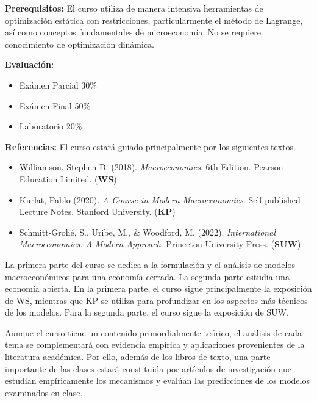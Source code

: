 \documentclass[12pt]{article}
\begin{document}
\noindent \textbf{Prerequisitos:} El curso utiliza de manera intensiva herramientas de optimización estática con restricciones, particularmente el método de Lagrange, así como conceptos fundamentales de microeconomía. No se requiere conocimiento de optimización dinámica.

\vspace{0.5cm}

\noindent \textbf{Evaluación:}
\begin{itemize}
    \item Exámen Parcial 30\%
    \item Exámen Final 50\%
    \item Laboratorio 20\%
\end{itemize}

\vspace{0.5cm}

\noindent \textbf{Referencias:}
El curso estará guiado principalmente por los siguientes textos.
\begin{itemize}
    \item Williamson, Stephen D. (2018). \textit{Macroeconomics}. 6th Edition. Pearson Education Limited. (\textbf{WS})
    \item Kurlat, Pablo (2020). \textit{A Course in Modern Macroeconomics}. Self-published Lecture Notes. Stanford University. (\textbf{KP})

    \item Schmitt-Grohé, S., Uribe, M., \& Woodford, M. (2022). \textit{International Macroeconomics: A Modern Approach}. Princeton University Press. (\textbf{SUW})
\end{itemize}

La primera parte del curso se dedica a la formulación y el análisis de modelos macroeconómicos para una economía cerrada. La segunda parte estudia una economía abierta. En la primera parte, el curso sigue principalmente la exposición de WS, mientras que KP se utiliza para profundizar en los aspectos más técnicos de los modelos. Para la segunda parte, el curso sigue la exposición de SUW.

Aunque el curso tiene un contenido primordialmente teórico, el análisis de cada tema se complementará con evidencia empírica y aplicaciones provenientes de la literatura académica. Por ello, además de los libros de texto, una parte importante de las clases estará constituida por artículos de investigación que estudian empíricamente los mecanismos y evalúan las predicciones de los modelos examinados en clase.
\end{document}
